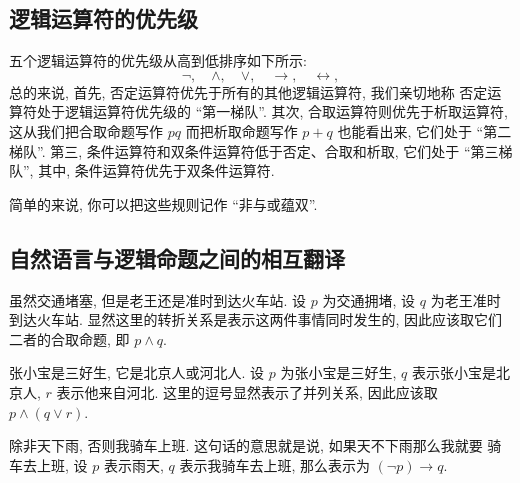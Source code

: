 \documentclass[10pt,UTF8]{book} %
\begin{document}
\subsection{逻辑运算符的优先级}

五个逻辑运算符的优先级从高到低排序如下所示:
\[ \lnot, \quad \wedge, \quad \vee, \quad \to, \quad \leftrightarrow, \]
总的来说, 首先, {\kaishu 否定运算符优先于所有的其他逻辑运算符}, 我们亲切地称
否定运算符处于逻辑运算符优先级的 “第一梯队”. 其次, {\kaishu 合取运算符则优先于析取运算符},
这从我们把合取命题写作 $pq$ 而把析取命题写作 $p+q$ 也能看出来, 它们处于 “第二梯队”.
第三, 条件运算符和双条件运算符低于否定、合取和析取, 它们处于 “第三梯队”,
其中, {\kaishu 条件运算符优先于双条件运算符}.

简单的来说, 你可以把这些规则记作 “非与或蕴双”.

\subsection{自然语言与逻辑命题之间的相互翻译}


\begin{example}
    {\kaishu 虽然交通堵塞, 但是老王还是准时到达火车站}. 设 $p$ 为交通拥堵,
        设 $q$ 为老王准时到达火车站. 显然这里的转折关系是表示这两件事情同时发生的,
        因此应该取它们二者的合取命题, 即 $p \wedge q$.
\end{example}

\begin{example}
    {\kaishu 张小宝是三好生, 它是北京人或河北人}. 设 $p$ 为张小宝是三好生,
        $q$ 表示张小宝是北京人, $r$ 表示他来自河北. 这里的逗号显然表示了并列关系,
        因此应该取 $p \wedge (q \vee r)$.
\end{example}

\begin{example}
    {\kaishu 除非天下雨, 否则我骑车上班}. 这句话的意思就是说, 如果天不下雨那么我就要
        骑车去上班, 设 $p$ 表示雨天, $q$ 表示我骑车去上班, 那么表示为
        $(\lnot p) \rightarrow q$.
\end{example}
\end{document}
